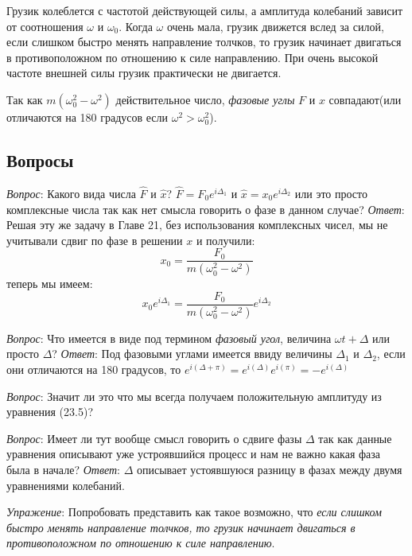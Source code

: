 \documentclass[12pt]{article}
\begin{document}
\medskip

Грузик колеблется с частотой действующей силы, а амплитуда колебаний зависит от соотношения $\omega$ и $\omega_0$. Когда $\omega$ очень мала, грузик движется вслед за силой, если слишком быстро менять направление толчков, то грузик начинает двигаться в противоположном по отношению к силе направлению. При очень высокой частоте внешней силы грузик практически не двигается.

Так как $m(\omega_0^2-\omega^2)$ действительное число, \textit{фазовые углы} $F$ и $x$ совпадают(или отличаются на 180 градусов если $\omega^2 > \omega_0^2$).

\subsection{Вопросы}

\textit{Вопрос}: Какого вида числа $\hat{F}$ и $\hat{x}$? $\hat{F}=F_0 e^{i \Delta_1}$ и $\hat{x}=x_0 e^{i \Delta_2}$ или это просто комплексные числа так как нет смысла говорить о фазе в данном случае? \textit{Ответ}: Решая эту же задачу в Главе 21, без использования комплексных чисел, мы не учитывали сдвиг по фазе в решении \(x\) и получили:
\[
    x_0 = \frac{F_0}{m(\omega_0^2-\omega^2)}
\]
теперь мы имеем:
\[
    x_0 e^{i \Delta_1} = \frac{F_0}{m(\omega_0^2-\omega^2)} e^{i \Delta_2}
\]

\medskip

\textit{Вопрос}: Что имеется в виде под термином \textit{фазовый угол}, величина $\omega t+\Delta$ или просто $\Delta$? \textit{Ответ}: Под фазовыми углами имеется ввиду величины \(\Delta_1\) и \(\Delta_2\), если они отличаются на 180 градусов, то \(e^{i(\Delta+\pi)} = e^{i(\Delta)}e^{i(\pi)} = -e^{i(\Delta)}\)

\medskip

\textit{Вопрос}: Значит ли это что мы всегда получаем положительную амплитуду из уравнения (23.5)?

\medskip

\textit{Вопрос}: Имеет ли тут вообще смысл говорить о сдвиге фазы $\Delta$ так как данные уравнения описывают уже устроявшийся процесс и нам не важно какая фаза была в начале?
\textit{Ответ}: $\Delta$ описывает устоявшуюся разницу в фазах между двумя уравнениями колебаний.

\textit{Упражение}: Попробовать представить как такое возможно, что \textit{если слишком быстро менять направление толчков, то грузик начинает двигаться в противоположном по отношению к силе направлению}.
\end{document}
